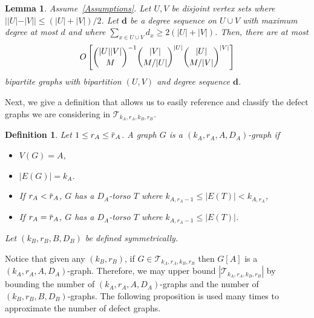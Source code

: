 \documentclass[11pt]{article}
\newcommand{\overbar}[1]{\mkern 1.5mu\overline{\mkern-1.5mu#1\mkern-1.5mu}\mkern 1.5mu}
\theoremstyle{plain}
\newtheorem{lem}[thm]{Lemma}
\newtheorem{definition}[thm]{Definition}
\begin{document}
\begin{lem}\label{cor: max sequence}
    Assume~\eqref{Assumptions}. Let $U,V$ be disjoint vertex sets where $||U| - |V|| \leq (|U| + |V|)/2$. Let $\mathbf d$ be a degree sequence on $U \cup V$ with maximum degree at most $d$ and where $\sum_{x \in U \cup V}d_x \geq 2(|U| + |V|)$. Then, there are at most 
    \begin{equation}\notag
        O\left[{|U||V| \choose M}^{-1}{|V| \choose M/|U|}^{|U|}{|U| \choose M/|V|}^{|V|}\right]
    \end{equation}
    bipartite graphs with bipartition $(U,V)$ and degree sequence $\mathbf d$.
    

\end{lem}

Next, we give a definition that allows us to easily reference and classify the defect graphs we are considering in $\mathcal T_{k_A, r_A, k_B, r_B}$.

\begin{definition} Let $1 \le r_A \leq \overbar{r}_{A}$.
    A graph $G$ is a $(k_A, r_A, A, D_A)$-graph if
    \begin{itemize}
        \item $V(G) = A$,
        \item $|E(G)| = k_A$.
        \item If $r_A < \overbar r_A$, $G$ has a $D_A$-torso $T$ where $k_{A, r_A-1} \leq |E(T)| < k_{A, r_A}$,
        \item If $r_A = \overbar r_A$, $G$ has a $D_A$-torso $T$ where $k_{A, r_A - 1} \leq |E(T)|$.
    \end{itemize}
    Let $(k_B, r_B, B, D_B)$ be defined symmetrically.
\end{definition}
Notice that given any $(k_B, r_B)$, if $G\in \mathcal T_{k_A, r_A, k_B, r_B}$ then $G[A]$ is a $(k_A, r_A, A, D_A)$-graph. Therefore, we may upper bound $|\mathcal T_{k_A, r_A, k_B, r_B}|$ by bounding the number of $(k_A, r_A, A, D_A)$-graphs and the number of $(k_B, r_B, B, D_B)$-graphs. The following proposition is used many times to approximate the number of defect graphs.
\end{document}
